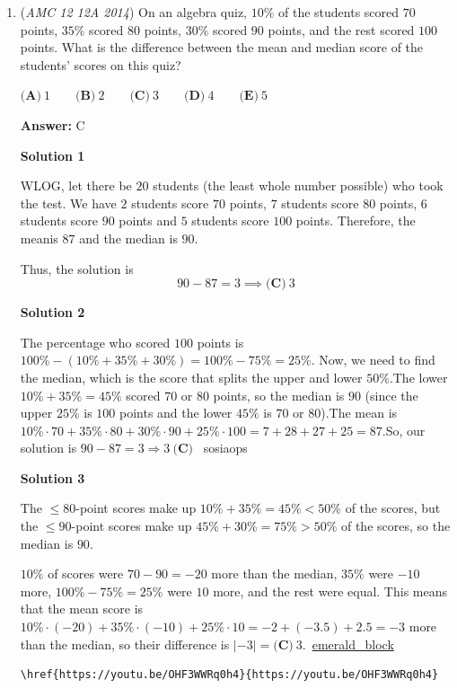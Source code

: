 \begin{enumerate}
	\item (\textit{AMC 12 12A 2014}) On an algebra quiz, $10\%$ of the students scored $70$ points, $35\%$ scored $80$ points, $30\%$ scored $90$ points, and the rest scored $100$ points. What is the difference between the mean and median score of the students' scores on this quiz?


 $\textbf{(A)}\ 1\qquad\textbf{(B)}\ 2\qquad\textbf{(C)}\ 3\qquad\textbf{(D)}\ 4\qquad\textbf{(E)}\ 5$

 \textbf{Answer: }C



\textbf{Solution 1}

WLOG, let there be $20$ students (the least whole number possible) who took the test. We have $2$ students score $70$ points, $7$ students score $80$ points, $6$ students score $90$ points and $5$ students score $100$ points. Therefore, the meanis $87$ and the median is $90$.

 Thus, the solution is 
 \[90-87=3\implies\boxed{\textbf{(C)} \ 3}\]




\textbf{Solution 2}

The percentage who scored $100$ points is $100\%-(10\%+35\%+30\%)=100\%-75\%=25\%$. Now, we need to find the median, which is the score that splits the upper and lower $50\%$.The lower $10\%+35\%=45\%$ scored $70$ or $80$ points, so the median is $90$ (since the upper $25\%$ is $100$ points and the lower $45\%$ is $70$ or $80$).The mean is $10\%\cdot70+35\%\cdot80+30\%\cdot90+25\%\cdot100=7+28+27+25=87$.So, our solution is $90-87=3\Rightarrow\boxed{3 \ \textbf{(C)} }$ ~sosiaops

 



\textbf{Solution 3}

The $\le 80$-point scores make up $10\%+35\% = 45\% < 50\%$ of the scores, but the $\le 90$-point scores make up $45\%+30\% = 75\% > 50\%$ of the scores, so the median is $90$.

 $10\%$ of scores were $70-90 = -20$ more than the median, $35\%$ were $-10$ more, $100\%-75\% = 25\%$ were $10$ more, and the rest were equal. This means that the mean score is $10\%\cdot(-20)+35\%\cdot(-10)+25\%\cdot10 = -2 + (-3.5) + 2.5 = -3$ more than the median, so their difference is $\left|-3\right| = \boxed{\textbf{(C)}\ 3}$.~\href{https://artofproblemsolving.com/wiki/index.php?title=User:Emerald\_block}{emerald\_block}

 \begin{verbatim}
\href{https://youtu.be/OHF3WWRq0h4}{https://youtu.be/OHF3WWRq0h4}
\end{verbatim}






\end{enumerate}
